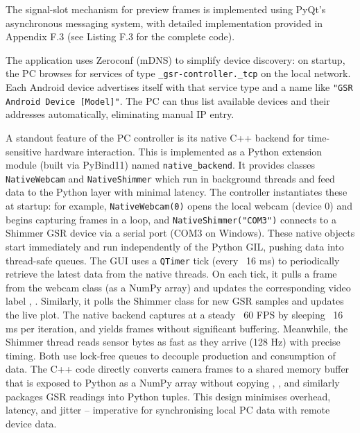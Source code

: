 The signal-slot mechanism for preview frames is implemented using PyQt's asynchronous messaging system, with detailed implementation provided in Appendix F.3 (see Listing F.3 for the complete code).

The application uses Zeroconf (mDNS) \cite{ref19} to simplify device discovery: on startup, the PC browses for services of type \texttt{\_gsr-controller.\_tcp} on the local network. Each Android device advertises itself with that service type and a name like \texttt{"GSR Android Device [Model]"}. The PC can thus list available devices and their addresses automatically, eliminating manual IP entry.

A standout feature of the PC controller is its native C++ backend for time-sensitive hardware interaction. This is implemented as a Python extension module (built via PyBind11) \cite{ref18} named \texttt{native\_backend}. It provides classes \texttt{NativeWebcam} and \texttt{NativeShimmer} which run in background threads and feed data to the Python layer with minimal latency. The controller instantiates these at startup: for example, \texttt{NativeWebcam(0)} opens the local webcam (device 0) and begins capturing frames in a loop, and \texttt{NativeShimmer("COM3")} connects to a Shimmer GSR device via a serial port (COM3 on Windows). These native objects start immediately and run independently of the Python GIL, pushing data into thread-safe queues. The GUI uses a \texttt{QTimer} tick (every ~16 ms) to periodically retrieve the latest data from the native threads. On each tick, it pulls a frame from the webcam class (as a NumPy array) and updates the corresponding video label \cite{ref1}, \cite{ref2}. Similarly, it polls the Shimmer class for new GSR samples and updates the live plot. The native backend captures at a steady ~60 FPS by sleeping ~16 ms per iteration, and yields frames without significant buffering. Meanwhile, the Shimmer thread reads sensor bytes as fast as they arrive (128 Hz) with precise timing. Both use lock-free queues to decouple production and consumption of data. The C++ code directly converts camera frames to a shared memory buffer that is exposed to Python as a NumPy array without copying \cite{ref1}, \cite{ref2}, and similarly packages GSR readings into Python tuples. This design minimises overhead, latency, and jitter -- imperative for synchronising local PC data with remote device data.

